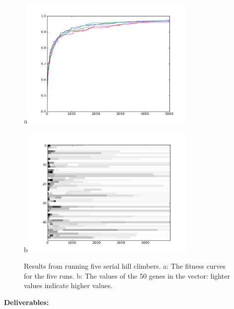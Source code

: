\documentclass[12pt]{article}
\begin{document}
\begin{figure}[!t]
\centerline{a\includegraphics[width=0.75\textwidth]{Fits}}
\centerline{b\includegraphics[width=0.75\textwidth]{Genes}}
\caption{Results from running five serial hill climbers.
a: The fitness curves for the five runs.
b: The values of the 50 genes in the vector: lighter values indicate higher values.}
\label{Fig}
\end{figure}

\noindent \textbf{Deliverables:}
\end{document}
